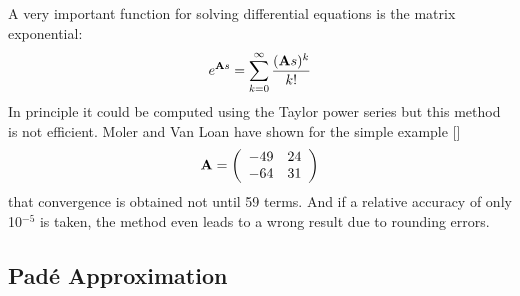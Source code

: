 A very important function for solving differential equations is the
matrix exponential:
\begin{eqnarray}
  \label{eq:mat_exp}
  e^{{\bf A}s} = \sum_{k=0}^\infty{\frac{({\bf A} s)^k}{k!}}
\end{eqnarray}
In principle it could be computed using the Taylor power series but 
 this method is not efficient. {\sc Moler} and {\sc Van
  Loan} have shown for the simple example [\cite{Moler_Loan:79}]
\[ {\bf A} =
\left(
  \begin{array}{cc}
    -49 & 24\\
    -64 & 31
    \end{array} \right) \]
that convergence is obtained not until 59 terms. And if a relative
accuracy of only 10$^{-5}$ is taken, the method even leads to a wrong
result due to rounding errors.

\subsection{Pad\'e Approximation}
\label{sec:pade_approximation}

